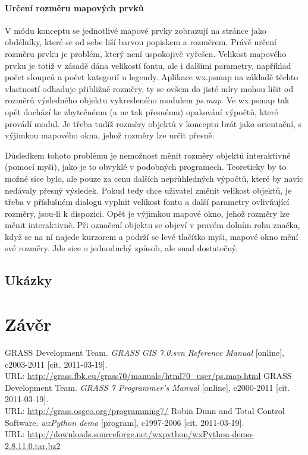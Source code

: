 \documentclass[a4paper,12pt,draft]{article}
\newcommand{\modul}[1]{\emph{#1}}
\begin{document}
 \paragraph*{Určení rozměru mapových prvků}
 V módu konceptu se jednotlivé mapové prvky zobrazují na stránce jako obdélníky, které se od sebe liší barvou popiskem a rozměrem. Právě určení rozměru prvku je problém, který není uspokojivě vyřešen. Velikost mapového prvku je totiž v zásadě dána velikostí fontu, ale i dalšími parametry, například počet sloupců a počet kategorií u legendy. Aplikace wx.psmap na základě těchto vlastností odhaduje přibližné rozměry, ty se ovšem do jisté míry mohou lišit od rozměrů výsledného objektu vykresleného modulem \modul{ps.map}. Ve wx.psmap tak opět dochází ke zbytečnému (a ne tak přesnému) opakování výpočtů, které provádí modul. Je třeba tudíž rozměry objektů v konceptu brát jako orientační, s výjimkou mapového okna, jehož rozměry lze určit přesně.
 
 Důsledkem tohoto problému je nemožnost měnit rozměry objektů interaktivně (pomocí myši), jako je to obvyklé v podobných programech. Teoreticky by to možné sice bylo, ale pouze za cenu dalších neprůhledných výpočtů, které by navíc nedávaly přesný výsledek. Pokud tedy chce uživatel změnit velikost objektů, je třeba v příslušném dialogu vyplnit velikost fontu a další parametry ovlivňující rozměry, jsou-li k dispozici. Opět je výjimkou mapové okno, jehož rozměry lze měnit interaktivně. Při označení objektu se objeví v pravém dolním rohu značka, když se na ní najede kurzorem a podrží se levé tlačítko myši, mapové okno mění své rozměry. Jde sice o jednoduchý způsob, ale snad dostatečný.
 

\subsection{Ukázky}

\section{Závěr}

\begin{thebibliography}{9}
\label{literatura}
 GRASS Development Team. \textit{GRASS GIS 7.0.svn Reference Manual} [online], c2003-2011 [cit. 2011-03-19].\\ URL: \url{http://grass.fbk.eu/grass70/manuals/html70_user/ps.map.html}
 GRASS Development Team. \textit{GRASS 7 Programmer's Manual} [online], c2000-2011 [cit. 2011-03-19].\\ URL: \url{http://grass.osgeo.org/programming7/}
 Robin Dunn and Total Control Software. \textit{wxPython demo} [program], c1997-2006 [cit. 2011-03-19].\\ URL: \url{http://downloads.sourceforge.net/wxpython/wxPython-demo-2.8.11.0.tar.bz2}
\end{thebibliography}
\end{document}
